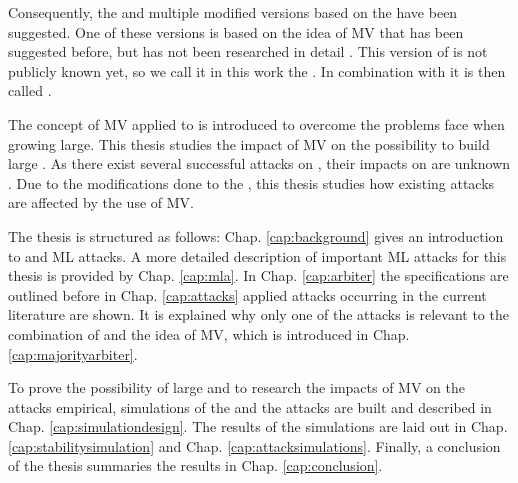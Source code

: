 Consequently, the \apuf and multiple modified versions based on the \apuf have been suggested. %
One of these versions is based on the idea of \ac{MV} that has been suggested before, but has not been researched in detail \cite{Ruhrmair2013PUFData}.
This version of \apufs is not publicly known yet, so we call it in this work the \mpuf.
In combination with \xpufs it is then called \mxpufs.

The concept of \ac{MV} applied to \apufs is introduced to overcome the problems \xpufs face when growing large.
This thesis studies the impact of \ac{MV} on the possibility to build large \xpufs. %
As there exist several successful attacks on \apufs, their impacts on \mpufs are unknown \cite{Ganji2016PACPUFs,Ruhrmair2014PUFOverview}.
Due to the modifications done to the \apuf, this thesis studies how existing attacks are affected by the use of \ac{MV}.

The thesis is structured as follows: 
Chap. \ref{cap:background} gives an introduction to \pufs and \ac{ML} attacks.
A more detailed description of important \ac{ML} attacks for this thesis is provided by Chap. \ref{cap:mla}. %
In Chap. \ref{cap:arbiter} the \apuf specifications are outlined before in Chap. \ref{cap:attacks} applied attacks occurring in the current literature are shown.
It is explained why only one of the attacks is relevant to the combination of \xpufs and the idea of \ac{MV}, which is introduced in Chap. \ref{cap:majorityarbiter}. %

To prove the possibility of large \mxpufs and to research the impacts of \ac{MV} on the attacks empirical, simulations of the \pufs and the attacks are built and described in Chap. \ref{cap:simulationdesign}. %
The results of the simulations are laid out in Chap. \ref{cap:stabilitysimulation} and Chap. \ref{cap:attacksimulations}.
Finally, a conclusion of the thesis summaries the results in Chap. \ref{cap:conclusion}.


